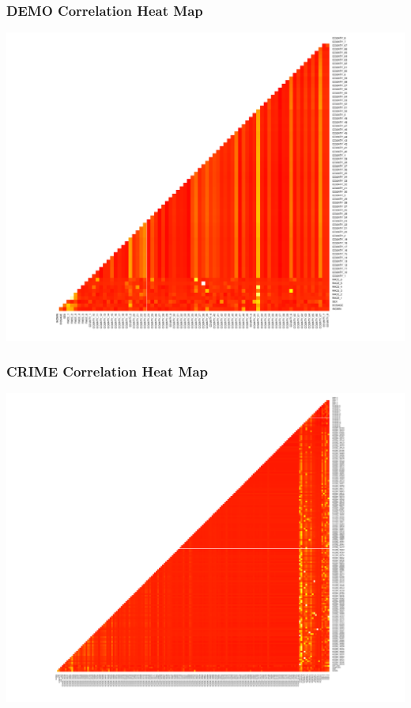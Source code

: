 \documentclass[11pt,letter]{article}
\begin{document}
\subsubsection{DEMO Correlation Heat Map}
\includegraphics[scale=0.5]{report_figures/demo.pdf}
\subsubsection{CRIME Correlation Heat Map}
\includegraphics[scale=0.5]{report_figures/crime.pdf}
\end{document}
